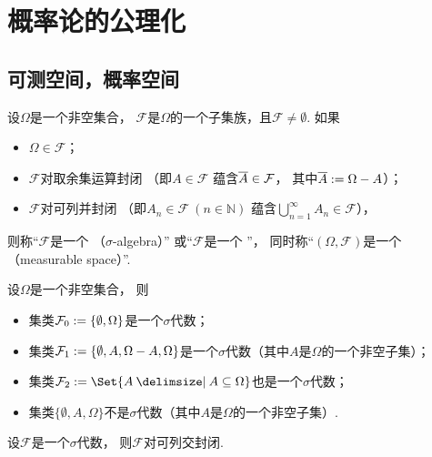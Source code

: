 \chapter{概率论的公理化}
\section{可测空间，概率空间}
\begin{definition}
设\(\Omega\)是一个非空集合，
\(\mathcal{F}\)是\(\Omega\)的一个子集族，且\(\mathcal{F}\neq\emptyset\).
如果\begin{itemize}
	\item \(\Omega \in \mathcal{F}\)；

	\item \(\mathcal{F}\)对取余集运算封闭
	（即\(A \in \mathcal{F}\)
	蕴含\(\SetComplementaryL{A} \in \mathcal{F}\)，
	其中\(\SetComplementaryL{A} \defeq \Omega - A\)）；

	\item \(\mathcal{F}\)对可列并封闭
	（即\(A_n \in \mathcal{F}\ (n \in \mathbb{N})\)
	蕴含\(\bigcup_{n=1}^\infty A_n \in \mathcal{F}\)），
\end{itemize}
则称“\(\mathcal{F}\)是一个 （\(\sigma\)-algebra）”
或“\(\mathcal{F}\)是一个 ”，
同时称“\((\Omega,\mathcal{F})\)是一个（measurable space）”.
\end{definition}

\begin{example}
设\(\Omega\)是一个非空集合，
则\begin{itemize}
	\item 集类\(\mathcal{F}_0 := \{\emptyset,\Omega\}\)是一个\(\sigma\)代数；
	\item 集类\(\mathcal{F}_1 := \{\emptyset,A,\Omega-A,\Omega\}\)是一个\(\sigma\)代数（其中\(A\)是\(\Omega\)的一个非空子集）；
	\item 集类\(\mathcal{F}_2 \defeq \Set{ A \given A \subseteq \Omega}\)也是一个\(\sigma\)代数；
	\item 集类\(\{\emptyset,A,\Omega\}\)不是\(\sigma\)代数（其中\(A\)是\(\Omega\)的一个非空子集）.
\end{itemize}
\end{example}

\begin{property}
设\(\mathcal{F}\)是一个\(\sigma\)代数，
则\(\mathcal{F}\)对可列交封闭.
\end{property}

